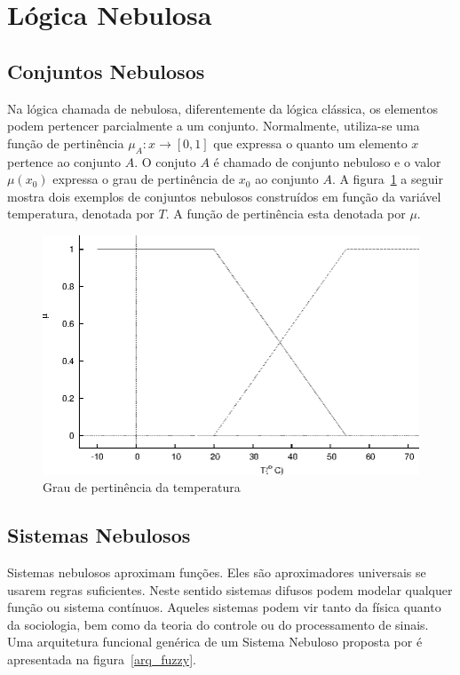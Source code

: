 \section{Lógica Nebulosa}

\subsection{Conjuntos Nebulosos}

Na lógica chamada de nebulosa, diferentemente da lógica clássica, os elementos
podem pertencer parcialmente a um conjunto. Normalmente, utiliza-se uma função
de pertinência $\mu_A : x \rightarrow [0,1]$ que expressa o quanto um elemento
$x$ pertence ao conjunto $A$. O conjuto $A$ é chamado de conjunto nebuloso e o
valor $\mu(x_0)$ expressa o grau de pertinência de $x_0$ ao conjunto $A$. A
figura~\ref{conj_fuzzy} a seguir mostra dois exemplos de conjuntos nebulosos
construídos em função da variável temperatura, denotada por $T$. A função de
pertinência esta denotada por $\mu$.

\begin{figure}
  \includegraphics[width=14cm]{imgs/fuzzy_graphic/fuzzy_graphic.eps}
  \caption{Grau de pertinência da temperatura \cite{passos2005datamining}}
  \label{conj_fuzzy}
\end{figure}

\subsection{Sistemas Nebulosos}

Sistemas nebulosos aproximam funções. Eles são aproximadores universais se
usarem regras suficientes. Neste sentido sistemas difusos podem modelar
qualquer função ou sistema contínuos. Aqueles sistemas podem vir tanto da física
quanto da sociologia, bem como da teoria do controle ou do processamento de
sinais. Uma arquitetura funcional genérica de um Sistema Nebuloso proposta por
\cite{passos2005datamining} é apresentada na figura~\ref{arq_fuzzy}.


